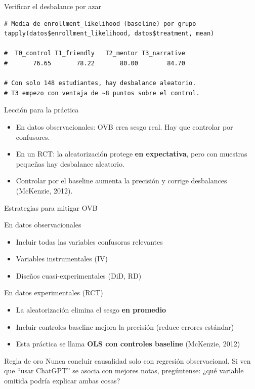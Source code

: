 \documentclass[aspectratio=169, 11pt]{beamer}
\begin{document}
\begin{frame}[fragile]{Verificar el desbalance por azar}
\begin{lstlisting}[basicstyle=\ttfamily\scriptsize]
# Media de enrollment_likelihood (baseline) por grupo
tapply(datos$enrollment_likelihood, datos$treatment, mean)

#  T0_control T1_friendly   T2_mentor T3_narrative
#       76.65       78.22       80.00        84.70

# Con solo 148 estudiantes, hay desbalance aleatorio.
# T3 empezo con ventaja de ~8 puntos sobre el control.
\end{lstlisting}

\vspace{0.2cm}
\begin{alertblock}{Lección para la práctica}
\begin{itemize}
  \item En datos observacionales: OVB crea sesgo real. Hay que controlar por confusores.
  \item En un RCT: la aleatorización protege \textbf{en expectativa}, pero con muestras pequeñas hay desbalance aleatorio.
  \item Controlar por el baseline aumenta la precisión y corrige desbalances (McKenzie, 2012).
\end{itemize}
\end{alertblock}
\end{frame}

\begin{frame}{Estrategias para mitigar OVB}
\begin{block}{En datos observacionales}
\begin{itemize}
  \item Incluir todas las variables confusoras relevantes
  \item Variables instrumentales (IV)
  \item Diseños cuasi-experimentales (DiD, RD)
\end{itemize}
\end{block}

\vspace{0.2cm}
\begin{block}{En datos experimentales (RCT)}
\begin{itemize}
  \item La aleatorización elimina el sesgo \textbf{en promedio}
  \item Incluir controles baseline mejora la precisión (reduce errores estándar)
  \item Esta práctica se llama \textbf{OLS con controles baseline} (McKenzie, 2012)
\end{itemize}
\end{block}

\vspace{0.2cm}
\begin{exampleblock}{Regla de oro}
\small Nunca concluir causalidad solo con regresión observacional. Si ven que ``usar ChatGPT'' se asocia con mejores notas, pregúntense: ¿qué variable omitida podría explicar ambas cosas?
\end{exampleblock}
\end{frame}
\end{document}
